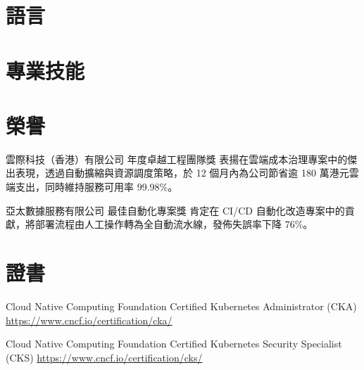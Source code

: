 \documentclass[a4paper, serif, 10pt]{moderncv}
\begin{document}
\section{語言}

\section{專業技能}

\section{榮譽}

        {雲際科技（香港）有限公司}
        {年度卓越工程團隊獎}
        {}
        {}
        {表揚在雲端成本治理專案中的傑出表現，透過自動擴縮與資源調度策略，於 12 個月內為公司節省逾 180 萬港元雲端支出，同時維持服務可用率 99.98\%。}

        {亞太數據服務有限公司}
        {最佳自動化專案獎}
        {}
        {}
        {肯定在 CI/CD 自動化改造專案中的貢獻，將部署流程由人工操作轉為全自動流水線，發佈失誤率下降 76\%。}
\section{證書}

        {Cloud Native Computing Foundation}
        {Certified Kubernetes Administrator (CKA)}
        {\url{https://www.cncf.io/certification/cka/}}
        {}
        {}

        {Cloud Native Computing Foundation}
        {Certified Kubernetes Security Specialist (CKS)}
        {\url{https://www.cncf.io/certification/cks/}}
        {}
        {}
\end{document}
